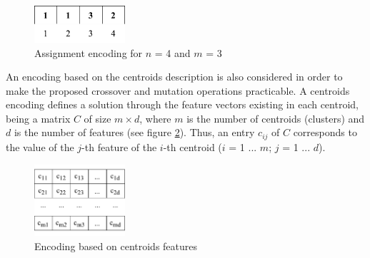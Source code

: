 \begin{figure}[h]
  \begin{center}
    \includegraphics[width=0.3\textwidth]{img/assignment-encoding}
    \caption{Assignment encoding for $n$ = 4 and $m$ = 3}\label{fig:assignment-encoding}
  \end{center}
\end{figure}

An encoding based on the centroids description is also considered in order to make the proposed crossover and mutation operations practicable. A centroids encoding defines a solution through the feature vectors existing in each centroid, being a matrix $C$ of size $m \times d$, where $m$ is the number of centroids (clusters) and $d$ is the number of features (see figure \ref{fig:centroids-encoding}). Thus, an entry $c_{ij}$ of $C$ corresponds to the value of the $j$-th feature of the $i$-th centroid ($i$ = 1 ... $m$; $j$ = 1 ... $d$).


\begin{figure}[h]
  \begin{center}
    \includegraphics[width=0.3\textwidth]{img/centroids-encoding}
    \caption{Encoding based on centroids features}\label{fig:centroids-encoding}
  \end{center}
\end{figure}


